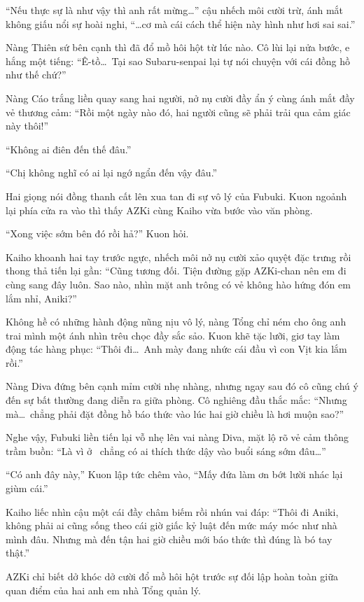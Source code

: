 \documentclass[../main.tex]{subfiles}
\begin{document}
``Nếu thực sự là như vậy thì anh rất mừng\dots'' cậu nhếch môi cười trừ, ánh mắt không giấu nổi sự hoài nghi, ``\dots cơ mà cái cách thể hiện này hình như hơi sai sai.''

Nàng Thiên sứ bên cạnh thì đã đổ mồ hôi hột từ lúc nào. Cô lùi lại nửa bước, e hắng một tiếng: ``Ê-tồ\dots\ Tại sao Subaru-senpai lại tự nói chuyện với cái đồng hồ như thế chứ?''

Nàng Cáo trắng liền quay sang hai người, nở nụ cười đầy ẩn ý cùng ánh mắt đầy vẻ thương cảm: ``Rồi một ngày nào đó, hai người cũng sẽ phải trải qua cảm giác này thôi!''

``Không ai điên đến thế đâu.''

``Chị không nghĩ có ai lại ngớ ngẩn đến vậy đâu.''

Hai giọng nói đồng thanh cất lên xua tan đi sự vô lý của Fubuki. Kuon ngoảnh lại phía cửa ra vào thì thấy AZKi cùng Kaiho vừa bước vào văn phòng.

``Xong việc sớm bên đó rồi hả?'' Kuon hỏi.

Kaiho khoanh hai tay trước ngực, nhếch môi nở nụ cười xảo quyệt đặc trưng rồi thong thả tiến lại gần: ``Cũng tương đối. Tiện đường gặp AZKi-chan nên em đi cùng sang đây luôn. Sao nào, nhìn mặt anh trông có vẻ không hào hứng đón em lắm nhỉ, Aniki?''

Không hề có những hành động nũng nịu vô lý, nàng Tổng chỉ ném cho ông anh trai mình một ánh nhìn trêu chọc đầy sắc sảo. Kuon khẽ tặc lưỡi, giơ tay làm động tác hàng phục: ``Thôi đi\dots\ Anh mày đang nhức cái đầu vì con Vịt kia lắm rồi.''

Nàng Diva đứng bên cạnh mỉm cười nhẹ nhàng, nhưng ngay sau đó cô cũng chú ý đến sự bất thường đang diễn ra giữa phòng. Cô nghiêng đầu thắc mắc: ``Nhưng mà\dots\ chẳng phải đặt đồng hồ báo thức vào lúc hai giờ chiều là hơi muộn sao?''

Nghe vậy, Fubuki liền tiến lại vỗ nhẹ lên vai nàng Diva, mặt lộ rõ vẻ cảm thông trầm buồn: ``Là vì ở \hll\ chẳng có ai thích thức dậy vào buổi sáng sớm đâu\dots''

``Có anh đây này,'' Kuon lập tức chêm vào, ``Mấy đứa làm ơn bớt lười nhác lại giùm cái.''

Kaiho liếc nhìn cậu một cái đầy châm biếm rồi nhún vai đáp: ``Thôi đi Aniki, không phải ai cũng sống theo cái giờ giấc kỷ luật đến mức máy móc như nhà mình đâu. Nhưng mà đến tận hai giờ chiều mới báo thức thì đúng là bó tay thật.''

AZKi chỉ biết dở khóc dở cười đổ mồ hôi hột trước sự đối lập hoàn toàn giữa quan điểm của hai anh em nhà Tổng quản lý.
\end{document}
